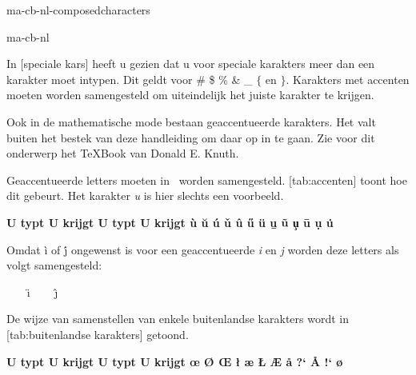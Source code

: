 \startonderdeel ma-cb-nl-composedcharacters

\produkt ma-cb-nl



In [speciale kars] heeft u gezien dat u voor
speciale karakters meer dan een karakter moet intypen. Dit
geldt voor \# \$ \% \& \_ $\{$ en $\}$. Karakters met
accenten moeten worden samengesteld om uiteindelijk het
juiste karakter te krijgen.

Ook in de mathematische mode bestaan geaccentueerde
karakters. Het valt buiten het bestek van deze handleiding
om daar op in te gaan. Zie voor dit onderwerp het \TeX Book
van Donald E. Knuth.



Geaccentueerde letters moeten in \CONTEXT\ worden samengesteld.
[tab:accenten] toont hoe dit gebeurt. Het karakter
{\em u} is hier slechts een voorbeeld.

\let\MySign=\=
\starttabel[|c|c|c|c|]
\HL
\NC \bf U typt \NC \bf U krijgt \VL \bf U typt \NC \bf U krijgt \NC\SR
\HL
\NC {} \NC \`{u}       \VL {}  \NC \u{u}  \NC\FR
\NC {} \NC \'{u}       \VL {}  \NC \v{u}  \NC\MR
\NC {} \NC \^{u}       \VL {}  \NC \H{u}  \NC\MR
\NC {} \NC \"{u}       \VL {}  \NC \b{u}  \NC\MR
\NC {} \NC \~{u}       \VL {}  \NC \c{u}  \NC\MR
\NC {} \NC \MySign{u}  \VL {}  \NC \d{u}  \NC\MR
\NC {} \NC \.{u}       \VL               \NC        \NC\LR
\HL
\stoptabel

Omdat \`{i} of \'{j} ongewenst is voor een geaccentueerde
{\em i} en {\em j} worden deze letters als volgt
samengesteld:

\type{\"{\i}} ~~~ \"{\i} \crlf
\type{\^{\j}} ~~~ \^{\j}



De wijze van samenstellen van enkele buitenlandse karakters
wordt in [tab:buitenlandse karakters] getoond.

%
%

\starttabel[|c|c|c|c|]
\HL
\NC \bf U typt \NC \bf U krijgt \VL \bf U typt \NC \bf U krijgt \NC\SR
\HL
\NC \type{\oe} \NC \oe \VL \type{\O}        \NC \O      \NC\FR
\NC \type{\OE} \NC \OE \VL \type{\l}        \NC \l      \NC\MR
\NC \type{\ae} \NC \ae \VL \type{\L}        \NC \L      \NC\MR
\NC \type{\AE} \NC \AE \VL \type{\SS}       \NC \SS     \NC\MR
\NC \type{\aa} \NC \aa \VL {} \NC ?`      \NC\MR
\NC \type{\AA} \NC \AA \VL \type{!} \NC !`      \NC\MR
\NC \type{\o}  \NC \o  \VL                  \NC         \NC\LR
\HL
\stoptabel

\stoponderdeel
